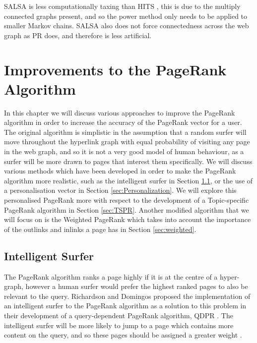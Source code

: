 \documentclass[11pt]{report}
\begin{document}
SALSA is less computationally taxing than HITS \cite{lempel2000stochastic}, this is due to the multiply connected graphs present, and so the power method only needs to be applied to smaller Markov chains. SALSA also does not force connectedness across the web graph as PR does, and therefore is less artificial. 

\chapter{Improvements to the PageRank Algorithm} \label{chap:Improve}
In this chapter we will discuss various approaches to improve the PageRank algorithm in order to increase the accuracy of the PageRank vector for a user. The original algorithm is simplistic in the assumption that a random surfer will move throughout the hyperlink graph with equal probability of visiting any page in the web graph, and so it is not a very good model of human behaviour, as a surfer will be more drawn to pages that interest them specifically. We will discuss various methods which have been developed in order to make the PageRank algorithm more realistic, such as the intelligent surfer in Section \ref{sec:intelligent}, or the use of a personalisation vector in Section \ref{sec:Personalization}. We will explore this personalised PageRank more with respect to the development of a Topic-specific PageRank algorithm in Section \ref{sec:TSPR}. Another modified algorithm that we will focus on is the Weighted PageRank which takes into account the importance of the outlinks and inlinks a page has in Section \ref{sec:weighted}. 

\section{Intelligent Surfer} \label{sec:intelligent}

The PageRank algorithm ranks a page highly if it is at the centre of a hyper-graph, however a human surfer would prefer the highest ranked pages to also be relevant to the query. Richardson and Domingos proposed the implementation of an intelligent surfer to the PageRank algorithm as a solution to this problem in their development of a query-dependent PageRank algorithm, QDPR \cite{richardson2002intelligent}. The intelligent surfer will be more likely to jump to a page which contains more content on the query, and so these pages should be assigned a greater weight \cite{langville}.
\end{document}
